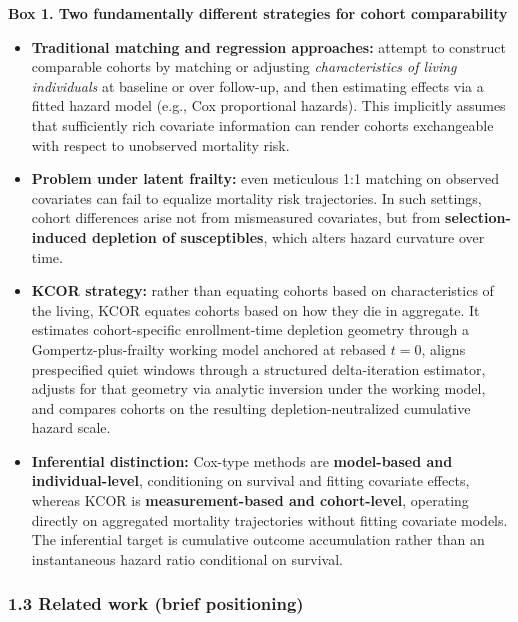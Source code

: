 \documentclass[
]{article}
\renewenvironment{quote}{\begin{mdframed}[style=kcorquote]}{\end{mdframed}}
\begin{document}
\begin{quote}
\textbf{Box 1. Two fundamentally different strategies for cohort
comparability}

\begin{itemize}
\item
  \textbf{Traditional matching and regression approaches:} attempt to
  construct comparable cohorts by matching or adjusting
  \emph{characteristics of living individuals} at baseline or over
  follow-up, and then estimating effects via a fitted hazard model
  (e.g., Cox proportional hazards). This implicitly assumes that
  sufficiently rich covariate information can render cohorts
  exchangeable with respect to unobserved mortality risk.
\item
  \textbf{Problem under latent frailty:} even meticulous 1:1 matching on
  observed covariates can fail to equalize mortality risk trajectories.
  In such settings, cohort differences arise not from mismeasured
  covariates, but from \textbf{selection-induced depletion of
  susceptibles}, which alters hazard curvature over time.
\item
  \textbf{KCOR strategy:} rather than equating cohorts based on
  characteristics of the living, KCOR equates cohorts based on how they
  die in aggregate. It estimates cohort-specific enrollment-time
  depletion geometry through a Gompertz-plus-frailty working model
  anchored at rebased \(t=0\), aligns prespecified quiet windows through
  a structured delta-iteration estimator, adjusts for that geometry via
  analytic inversion under the working model, and compares cohorts on
  the resulting depletion-neutralized cumulative hazard scale.
\item
  \textbf{Inferential distinction:} Cox-type methods are
  \textbf{model-based and individual-level}, conditioning on survival
  and fitting covariate effects, whereas KCOR is
  \textbf{measurement-based and cohort-level}, operating directly on
  aggregated mortality trajectories without fitting covariate models.
  The inferential target is cumulative outcome accumulation rather than
  an instantaneous hazard ratio conditional on survival.
\end{itemize}
\end{quote}

\subsubsection{1.3 Related work (brief
positioning)}\label{related-work-brief-positioning}
\end{document}

